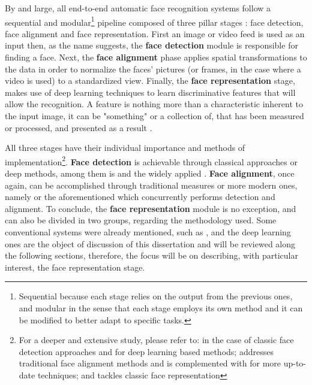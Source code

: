 \documentclass[class=report, crop=false, a4paper, 12pt]{standalone}
\begin{document}
\par By and large, all end-to-end automatic face recognition systems follow a sequential and modular\footnote{Sequential because each stage relies on the output from the previous ones, and modular in the sense that each stage employs its own method and it can be modified to better adapt to specific tasks.} pipeline  composed of three pillar stages \autocite{wangDeepFaceRecognition2021}: face detection, face alignment and face representation. First an image or video feed is used as an input then, as the name suggests, the \textbf{face detection} module is responsible for finding a face. Next, the \textbf{face alignment} phase applies spatial transformations to the data in order to normalize the faces' pictures (or frames, in the case where a video is used) to a standardized view. Finally, the \textbf{face representation} stage, makes use of deep learning techniques to learn discriminative features that will allow the recognition. A feature is nothing more than a characteristic inherent to the input image, it can be "something" or a collection of, that has been measured or processed, and presented as a result \autocite{Goodfellow-et-al-2016}.

\par All three stages have their individual importance and methods of implementation\footnote{For a deeper and extensive study, please refer to: \autocite{zafeiriouSurveyFaceDetection2015} in the case of classic face detection approaches and \autocite{minaeeGoingDeeperFace2021} for deep learning based methods; \autocite{wangFacialFeaturePoint2018} addresses traditional face alignment methods and is complemented with \autocite{duElementsEndtoendDeep2022} for more up-to-date techniques; and \autocite{learned-millerLabeledFacesWild2016} tackles classic face representation }. \textbf{Face detection} is achievable through classical approaches \autocite{violaRapidObjectDetection2001, brubakerDesignCascadesBoosted2008} or deep methods, among them is \autocite{dengRetinaFaceSinglestageDense2019} and the widely applied \autocite{zhangJointFaceDetection2016a}. \textbf{Face alignment}, once again, can be accomplished through traditional measures \autocite{cootesViewbasedActiveAppearance2002, martinezLocalEvidenceAggregation2013} or more modern ones, namely \autocite{huangPropagationNetPropagatePoints2020} or the aforementioned \autocite{zhangJointFaceDetection2016a} which concurrently performs detection and alignment. To conclude, the \textbf{face representation} module is no exception, and can also be divided in two groups, regarding the methodology used. Some conventional systems were already mentioned, such as \autocite{p.n.belhumeurEigenfacesVsFisherfaces1997,turkEigenfacesRecognition1991}, and the deep learning ones are the object of discussion of this dissertation and will be reviewed along the following sections, therefore, the focus will be on describing, with particular interest, the face representation stage.
\end{document}
